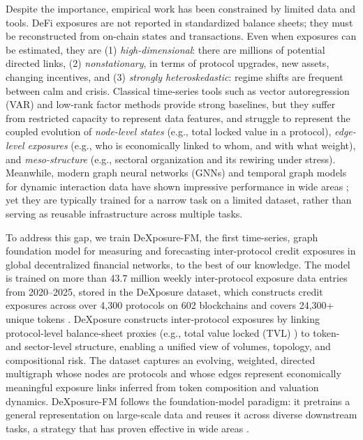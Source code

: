 Despite the importance, empirical work has been constrained by limited data and tools. %
DeFi exposures are not reported in standardized balance sheets; they must be reconstructed from on-chain states and transactions. Even when exposures can be estimated, they are (1) \emph{high-dimensional}: there are millions of potential directed links, (2) \emph{nonstationary}, in terms of protocol upgrades, new assets, changing incentives, and (3) \emph{strongly heteroskedastic}: regime shifts are frequent between calm and crisis. Classical time-series tools such as vector autoregression (VAR) \citep{Sims1980} and low-rank factor methods \citep{StockWatson2002} provide strong baselines, but they suffer from restricted capacity to represent data features, and struggle to represent the coupled evolution of \emph{node-level states} (e.g., total locked value in a protocol), \emph{edge-level exposures} (e.g., who is economically linked to whom, and with what weight), and \emph{meso-structure} (e.g., sectoral organization and its rewiring under stress). Meanwhile, modern graph neural networks (GNNs) \citep{KipfWelling2017,VelickovicEtAl2018} and temporal graph models for dynamic interaction data \citep{rossi2020temporalgraphnetworksdeep} have shown impressive performance in wide areas%
; yet they are typically trained for a narrow task on a limited dataset, rather than serving as reusable infrastructure across multiple tasks.

To address this gap, we train {DeXposure-FM}, the first time-series, graph foundation model for measuring and forecasting inter-protocol credit exposures in global decentralized financial networks, to the best of our knowledge. The model is trained on more than 43.7 million weekly inter-protocol exposure data entries from 2020--2025, stored in the {DeXposure} dataset, which constructs credit exposures across over 4,300 protocols on 602 blockchains and covers 24,300+ unique tokens \cite{wu2025dexposuredatasetbenchmarksinterprotocol}. DeXposure constructs inter-protocol exposures by linking protocol-level balance-sheet proxies (e.g., total value locked (TVL) \citep{BIS2025TVL}) to token- and sector-level structure, enabling a unified view of volumes, topology, and compositional risk. The dataset captures an evolving, weighted, directed multigraph whose nodes are protocols and whose edges represent economically meaningful exposure links inferred from token composition and valuation dynamics. DeXposure-FM follows the foundation-model paradigm: it pretrains a general representation on large-scale data and reuses it across diverse downstream tasks, a strategy that has proven effective in wide areas \citep{BommasaniEtAl2021FoundationModels}. 

